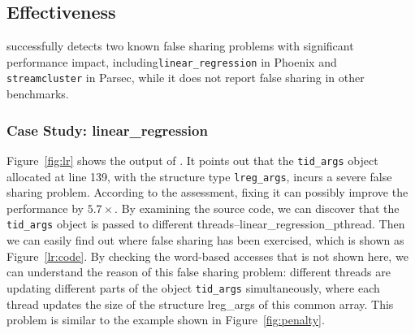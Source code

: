 
 
\subsection{Effectiveness}
\label{sec:effectiveness}

\cheetah{} successfully detects two known false sharing problems with significant performance impact, including\texttt{linear\_regression} in Phoenix and \texttt{streamcluster} in Parsec, while it does not report false sharing in other benchmarks. 



\subsubsection{Case Study: linear\_regression}
Figure~\ref{fig:lr} shows the output of \cheetah{}. It points out that the {\tt tid\_args} object allocated at line 139, with the structure type {\tt lreg\_args}, incurs a severe false sharing problem. According to the assessment, fixing it can possibly improve the performance by $5.7\times$. By examining the source code, we can discover that the {\tt tid\_args} object is passed to different threads--linear\_regression\_pthread. Then we can easily find out where false sharing has been exercised, which is shown as Figure~\ref{lr:code}. By checking the word-based accesses that is not shown here, we can understand the reason of this false sharing problem: different threads are updating different parts of the object {\tt tid\_args} simultaneously, where each thread updates the size of the structure lreg\_args of this common array. This problem is similar to the example shown in Figure~\ref{fig:penalty}. 

